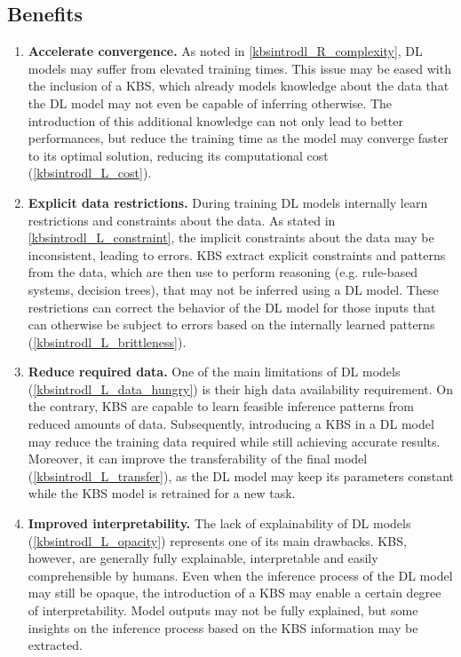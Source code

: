 \subsection{Benefits}
\begin{enumerate} [start=1,label={\bfseries B\arabic*.}]
    \item \label{kbsintrodl_B_convergence} \textbf{Accelerate convergence.} As noted in \ref{kbsintrodl_R_complexity}, DL models may suffer from elevated training times. This issue may be eased with the inclusion of a KBS, which already models knowledge about the data that the DL model may not even be capable of inferring otherwise. The introduction of this additional knowledge can not only lead to better performances, but reduce the training time as the model may converge faster to its optimal solution, reducing its computational cost (\ref{kbsintrodl_L_cost}).
    
    \item \label{kbsintrodl_B_restrictions} \textbf{Explicit data restrictions.} During training DL models internally learn restrictions and constraints about the data. As stated in \ref{kbsintrodl_L_constraint}, the implicit constraints about the data may be inconsistent, leading to errors. KBS extract explicit constraints and patterns from the data, which are then use to perform reasoning (e.g. rule-based systems, decision trees), that may not be inferred using a DL model. These restrictions can correct the behavior of the DL model for those inputs that can otherwise be subject to errors based on the internally learned patterns (\ref{kbsintrodl_L_brittleness}). 
    
    \item \label{kbsintrodl_B_reduce} \textbf{Reduce required data.} One of the main limitations of DL models (\ref{kbsintrodl_L_data_hungry}) is their high data availability requirement. On the contrary, KBS are capable to learn feasible inference patterns from reduced amounts of data. Subsequently, introducing a KBS in a DL model may reduce the training data required while still achieving accurate results. Moreover, it can improve the transferability of the final model (\ref{kbsintrodl_L_transfer}), as the DL model may keep its parameters constant while the KBS model is retrained for a new task. 
    
    \item \label{kbsintrodl_B_interpretability} \textbf{Improved interpretability.} The lack of explainability of DL models (\ref{kbsintrodl_L_opacity}) represents one of its main drawbacks. KBS, however, are generally fully explainable, interpretable and easily comprehensible by humans. Even when the inference process of the DL model may still be opaque, the introduction of a KBS may enable a certain degree of interpretability. Model outputs may not be fully explained, but some insights on the inference process based on the KBS information may be extracted.
    
\end{enumerate}

